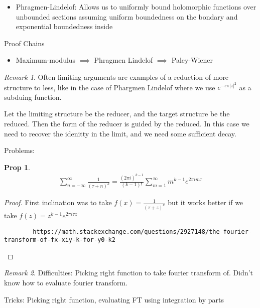 \documentclass[11pt]{article}
\newtheorem{prop}{Prop}
\theoremstyle{remark}
\newtheorem{remark}{Remark}
\begin{document}
\begin{itemize}
	\item Phragmen-Lindelof: Allows us to uniformly bound holomorphic functions over unbounded sections assuming uniform boundedness on the bondary and exponential boundedness inside
\end{itemize}

Proof Chains

\begin{itemize}
	\item Maximum-modulus $\implies$ Phragmen Lindelof $\implies$ Paley-Wiener
\end{itemize}

\begin{remark}
	Often limiting arguments are examples of a reduction of more structure to less, like in the case of Phargmen Lindelof where we use $e^{-\epsilon\pi|z|^2}$ as a subduing function.

	Let the limiting structure be the reducer, and the target structure be the reduced. Then the form of the reducer is guided by the reduced. In this case we need to recover the idenitty in the limit, and we need some sufficient decay.
\end{remark}

Problems:

\begin{prop}
	\begin{align*}
		\sum_{n=-\infty}^{\infty} \frac{1}{(\tau + n)^k} = \frac{(2\pi i)^{k-1}}{(k-1)!} \sum_{m=1}^{\infty} m^{k-1}e^{2 \pi i m \tau}
	\end{align*}
\end{prop}

\begin{proof}
	First inclination was to take $f(x) = \frac{1}{(\tau+z)^k}$ but it works better if we take $f(z) = z^{k-1}e^{2\pi i \tau z}$

	\begin{verbatim}
		https://math.stackexchange.com/questions/2927148/the-fourier-transform-of-fx-xiy-k-for-y0-k2
	\end{verbatim}
\end{proof}

\begin{remark}
	Difficulties: Picking right function to take fourier transform of. Didn't know how to evaluate fourier transform.

	Tricks: Picking right function, evaluating FT using integration by parts
\end{remark}
\end{document}

